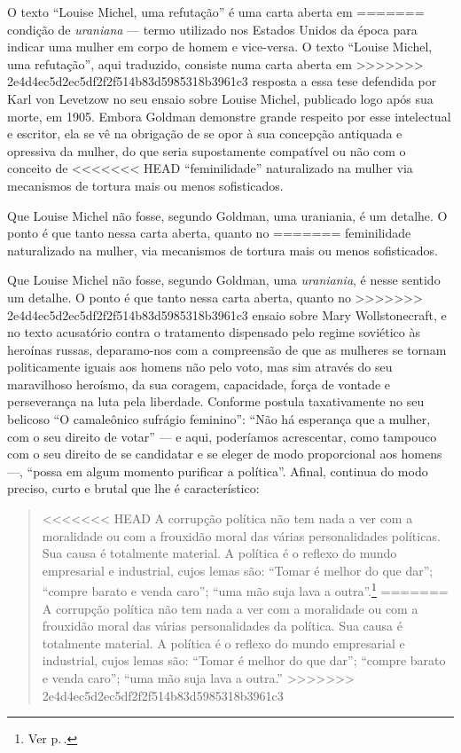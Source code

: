O texto ``Louise
Michel, uma refutação'' é uma carta aberta em
=======
condição de \textit{uraniana} --- termo utilizado nos Estados Unidos da época
para indicar uma mulher em corpo de homem e vice-versa. O texto ``Louise
Michel, uma refutação'', aqui traduzido, consiste numa carta aberta em
>>>>>>> 2e4d4ec5d2ec5df2f2f514b83d5985318b3961c3
resposta a essa tese defendida por Karl von Levetzow no seu ensaio sobre
Louise Michel, publicado logo após sua morte, em 1905. Embora Goldman
demonstre grande respeito por esse intelectual e escritor, ela se vê na
obrigação de se opor à sua concepção antiquada e opressiva da mulher, do
que seria supostamente compatível ou não com o conceito de
<<<<<<< HEAD
``feminilidade'' naturalizado na mulher via mecanismos de tortura mais
ou menos sofisticados.

Que Louise Michel não fosse, segundo Goldman, uma uraniania, é
um detalhe. O ponto é que tanto nessa carta aberta, quanto no
=======
feminilidade naturalizado na mulher, via mecanismos de tortura mais
ou menos sofisticados.

Que Louise Michel não fosse, segundo Goldman, uma \textit{uraniania}, é nesse
sentido um detalhe. O ponto é que tanto nessa carta aberta, quanto no
>>>>>>> 2e4d4ec5d2ec5df2f2f514b83d5985318b3961c3
ensaio sobre Mary Wollstonecraft, e no texto acusatório contra o
tratamento dispensado pelo regime soviético às heroínas russas,
deparamo-nos com a compreensão de que as mulheres se tornam
politicamente iguais aos homens não pelo voto, mas sim através do seu
maravilhoso heroísmo, da sua coragem, capacidade, força de vontade e
perseverança na luta pela liberdade. Conforme postula taxativamente no
seu belicoso ``O camaleônico sufrágio feminino'': ``Não há
esperança que a mulher, com o seu direito de votar'' --- e aqui,
poderíamos acrescentar, como tampouco com o seu direito de se
candidatar e se eleger de modo proporcional aos homens ---, ``possa em
algum momento purificar a política''. Afinal, continua do modo preciso,
curto e brutal que lhe é característico:

\begin{quote}
<<<<<<< HEAD
A corrupção política não tem nada a ver com a
moralidade ou com a frouxidão moral das várias personalidades
políticas. Sua causa é totalmente material. A política é o reflexo do
mundo empresarial e industrial, cujos lemas são: ``Tomar é melhor do que
dar''; ``compre barato e venda caro''; ``uma mão suja lava a outra''.\footnote{Ver p.\,\pageref{suja}.}
=======
A corrupção política não tem nada a ver com a moralidade ou com a
frouxidão moral das várias personalidades da política. Sua causa é
totalmente material. A política é o reflexo do mundo empresarial e
industrial, cujos lemas são: ``Tomar é melhor do que dar''; ``compre
barato e venda caro''; ``uma mão suja lava a outra.''
>>>>>>> 2e4d4ec5d2ec5df2f2f514b83d5985318b3961c3
\end{quote}

